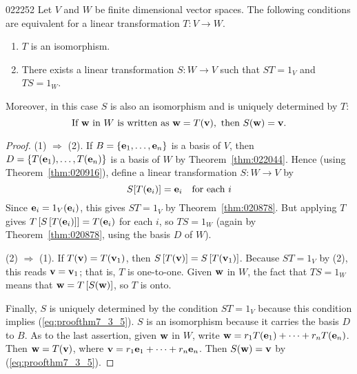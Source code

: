 \begin{theorem}{}{022252}
Let $V$ and $W$ be finite dimensional vector spaces. The following conditions are equivalent for a linear transformation $T : V \to W$.


\begin{enumerate}
\item $T$ is an isomorphism.

\item There exists a linear transformation $S : W \to V$ such that $ST = 1_{V}$ and $TS = 1_{W}$.

\end{enumerate}

Moreover, in this case $S$ is also an isomorphism and is uniquely determined by $T$:
\begin{equation*}
\mbox{If } \textbf{w} \mbox{ in } W \mbox{ is written as } \textbf{w} = T(\textbf{v}), \mbox{ then } S(\textbf{w}) = \textbf{v}.
 \end{equation*}
\end{theorem}

\begin{proof}
(1) $\Rightarrow$ (2). If $B = \{\textbf{e}_{1}, \dots, \textbf{e}_{n}\}$ is a basis of $V$, then $D = \{T(\textbf{e}_{1}), \dots, T(\textbf{e}_{n})\}$ is a basis of $W$ by Theorem~\ref{thm:022044}. Hence (using Theorem~\ref{thm:020916}), define a linear transformation $S : W \to V$ by
\begin{equation}\label{eq:proofthm7_3_5}
S[T(\textbf{e}_i)] = \textbf{e}_i \quad \mbox{for each } i
\end{equation}
Since $\textbf{e}_{i} = 1_{V}(\textbf{e}_{i})$, this gives $ST = 1_{V}$ by Theorem~\ref{thm:020878}. But applying $T$ gives $T\left[S\left[T(\textbf{e}_{i})\right]\right] = T(\textbf{e}_{i})$ for each $i$, so $TS = 1_{W}$ (again by Theorem~\ref{thm:020878}, using the basis $D$ of $W$).


(2) $\Rightarrow$ (1). If $T(\textbf{v}) = T(\textbf{v}_{1})$, then $S\left[T(\textbf{v})\right] = S\left[T(\textbf{v}_{1})\right]$. Because $ST = 1_{V}$ by (2), this reads $\textbf{v} = \textbf{v}_{1}$; that is, $T$ is one-to-one. Given $\textbf{w}$ in $W$, the fact that $TS = 1_{W}$ means that $\textbf{w} = T\left[S(\textbf{w})\right]$, so $T$ is onto.


Finally, $S$ is uniquely determined by the condition $ST = 1_{V}$ because this condition implies (\ref{eq:proofthm7_3_5}). $S$ is an isomorphism because it carries the basis $D$ to $B$. As to the last assertion, given $\textbf{w}$ in $W$, write $\textbf{w} = r_{1}T(\textbf{e}_{1}) + \cdots + r_{n}T(\textbf{e}_{n})$. Then $\textbf{w} = T(\textbf{v})$, where $\textbf{v} = r_{1}\textbf{e}_{1} + \cdots + r_{n}\textbf{e}_{n}$. Then $S(\textbf{w}) = \textbf{v}$ by (\ref{eq:proofthm7_3_5}).
\end{proof}


